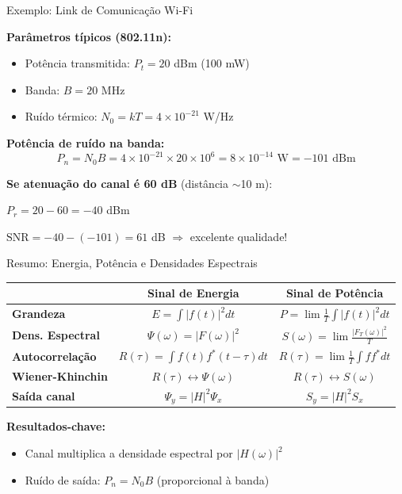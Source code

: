 \begin{frame}{Exemplo: Link de Comunicação Wi-Fi}

\textbf{Parâmetros típicos (802.11n):}

\begin{itemize}
\item Potência transmitida: $P_t = 20$ dBm (100 mW)
\item Banda: $B = 20$ MHz
\item Ruído térmico: $N_0 = kT = 4 \times 10^{-21}$ W/Hz
\end{itemize}

\textbf{Potência de ruído na banda:}
\[
P_n = N_0 B = 4 \times 10^{-21} \times 20 \times 10^6 = 8 \times 10^{-14} \text{ W} = -101 \text{ dBm}
\]

\textbf{Se atenuação do canal é 60 dB} (distância $\sim$10 m):

$P_r = 20 - 60 = -40$ dBm

$\text{SNR} = -40 - (-101) = 61$ dB $\Rightarrow$ excelente qualidade!

\end{frame}


\begin{frame}{Resumo: Energia, Potência e Densidades Espectrais}

\begin{center}
\renewcommand{\arraystretch}{1.4}
\begin{tabular}{|l|c|c|}
\hline
& \textbf{Sinal de Energia} & \textbf{Sinal de Potência} \\ \hline
\textbf{Grandeza} & $E = \int |f(t)|^2 dt$ & $P = \lim \frac{1}{T}\int |f(t)|^2 dt$ \\ \hline
\textbf{Dens. Espectral} & $\Psi(\omega) = |F(\omega)|^2$ & $S(\omega) = \lim \frac{|F_T(\omega)|^2}{T}$ \\ \hline
\textbf{Autocorrelação} & $R(\tau) = \int f(t) f^*(t-\tau) dt$ & $R(\tau) = \lim \frac{1}{T}\int f f^* dt$ \\ \hline
\textbf{Wiener-Khinchin} & $R(\tau) \leftrightarrow \Psi(\omega)$ & $R(\tau) \leftrightarrow S(\omega)$ \\ \hline
\textbf{Saída canal} & $\Psi_y = |H|^2 \Psi_x$ & $S_y = |H|^2 S_x$ \\ \hline
\end{tabular}
\end{center}

\vspace{0.2cm}

\textbf{Resultados-chave:}

\begin{itemize}
\item Canal multiplica a densidade espectral por $|H(\omega)|^2$
\item Ruído de saída: $P_n = N_0 B$ (proporcional à banda)
\end{itemize}

\end{frame}
